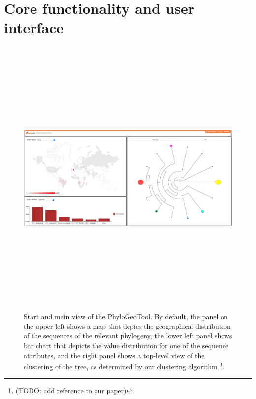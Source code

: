 \documentclass[a4paper, 11pt]{article} %
\begin{document}
\section{Core functionality and user interface}




\begin{figure}[H]
\centering
\includegraphics[width=400pt, height=400pt, keepaspectratio=true]{images/initial_view.PNG}
\caption{Start and main view of the PhyloGeoTool. By default, the panel on the upper left shows a map that depics the geographical distribution of the sequences of the relevant phylogeny, the lower left panel shows bar chart that depicts the value distribution for one of the sequence attributes, and the right panel shows a top-level view of the clustering of the tree, as determined by our clustering algorithm \footnote{(TODO: add reference to our paper)}.}
\label{fig:initial_view}
\end{figure}
\end{document}
